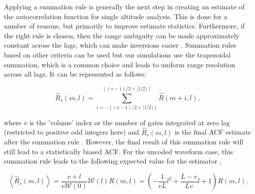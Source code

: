 %
%

Applying a summation rule is generally the next step in creating an estimate of the autocorrelation function for single altitude analysis. This is done for a number of reasons, but primarily to improve estimate statistics.  Furthermore, if the right rule is chosen, then the range ambiguity can be made approximately constant across the lags, which can make inversions easier \cite{nygren1996}. Summation rules based on other criteria can be used but our simulations use the trapezoidal summation, which is a common choice and leads to uniform range resolution across all lags. It can be represented as follows:

\begin{equation}
\label{eq:sumrule}
\widehat{R}_s(m,l) = \displaystyle\sum\limits_{i=-((v-1)/2+\lceil l/2 \rceil)}^{((v-1)/2+\lfloor l/2\rfloor)} \widehat{R}(m+i,l),
\end{equation}

\noindent where $v$ is the 'volume' index or the number of gates integrated at zero lag (restricted to positive odd integers here) and $\widehat{R}_s(m,l)$ is the final ACF estimate after the summation rule \cite{nygren1996}. 
However, the final result of this summation rule will still lead to a statistically biased ACF. For the uncoded waveform case, this summation rule leads to the following expected value for the estimator \cite{nygren1996},

\begin{equation}
\label{eq:sumruleest}
\left\langle\widehat{R}_s(m,l) \right\rangle  =\frac{v+l}{v\mathcal{W}(0)}\mathcal{W}(l)R(m,l) =\left(-\frac{1}{vL}l^2+\frac{L-v}{Lv}l+1\right)   R(m,l).
\end{equation}

